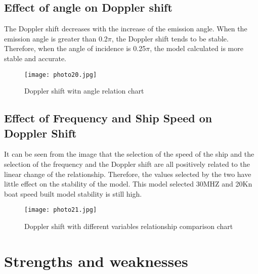 \documentclass{mcmthesis}
\begin{document}
\subsection{Effect of angle on Doppler shift}%
The Doppler shift decreases with the increase of the emission angle. When the emission angle is greater than 0.2$\pi$, the Doppler shift tends to be stable. Therefore, when the angle of incidence is 0.25$\pi$, the model calculated is more stable and accurate.
\begin{figure}[h]
\small
\centering
\texttt{[image: photo20.jpg]}
\caption{Doppler shift witn angle relation chart} \label{fig:aa}
\end{figure}
\subsection{Effect of Frequency and Ship Speed on Doppler Shift}%
It can be seen from the image that the selection of the speed of the ship and the selection of the frequency and the Doppler shift are all positively related to the linear change of the relationship. Therefore, the values selected by the two have little effect on the stability of the model. This model selected 30MHZ and 20Kn boat speed built model stability is still high.
\begin{figure}[h]
\small
\centering
\texttt{[image: photo21.jpg]}
\caption{Doppler shift with different variables relationship comparison chart} \label{fig:aa}
\end{figure}

\section{Strengths and weaknesses}
\end{document}
